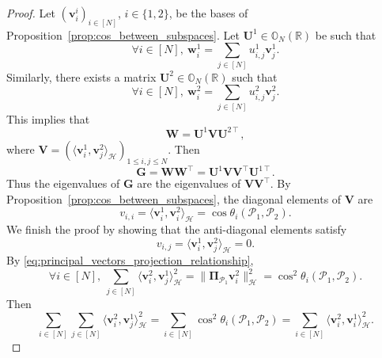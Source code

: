 \documentclass[twoside,11pt]{book}
\DeclareMathOperator{\Tran}{\intercal}
\begin{document}
\begin{proof}
Let $(\bm{v}^{i}_{i})_{i \in [N]}$, $i\in\{1,2\}$, be the bases of Proposition~\ref{prop:cos_between_subspaces}. Let $\bm{U}^{1} \in \mathbb{O}_{N}(\mathbb{R})$ be such that
\begin{equation}
\forall i \in [N], \: \bm{w}^{1}_{i} = \sum\limits_{j \in [N]} u^{1}_{i,j} \bm{v}^{1}_{j}.
\end{equation}
Similarly, there exists a matrix $\bm{U}^{2} \in \mathbb{O}_{N}(\mathbb{R})$ such that
\begin{equation}
\forall i \in [N], \: \bm{w}^{2}_{i} = \sum\limits_{j \in [N]} u^{2}_{i,j} \bm{v}^{2}_{j}.
\end{equation}
This implies that
\begin{equation}
\bm{W} = \bm{U}^{1}\bm{V}\bm{U}^{2 \Tran},
\end{equation}
where $\displaystyle \bm{V} = (\langle \bm{v}^{1}_{i}, \bm{v}^{2}_{j} \rangle_{\mathcal{H}})_{1 \leq i,j \leq N}$. Then
\begin{equation}
\bm{G} = \bm{W}\bm{W}^{\Tran} = \bm{U}^{1}\bm{V}\bm{V}^{\Tran}\bm{U}^{1 \Tran}.
\end{equation}
Thus the eigenvalues of $\bm{G}$ are the eigenvalues of $\bm{V}\bm{V}^{\Tran}$. By Proposition~\ref{prop:cos_between_subspaces}, the diagonal elements of $\bm{V}$ are
\begin{equation}\label{eq:diagonal_of_V}
v_{i,i} = \langle \bm{v}^{1}_{i}, \bm{v}^{2}_{i} \rangle_{\mathcal{H}} = \cos \theta_{i}(\mathcal{P}_{1},\mathcal{P}_{2}).
\end{equation}
We finish the proof by showing that the anti-diagonal elements satisfy
\begin{equation}\label{eq:anti_diagonal_of_V}
v_{i,j} = \langle \bm{v}^{1}_{i}, \bm{v}^{2}_{j} \rangle_{\mathcal{H}} = 0.
\end{equation}
By \eqref{eq:principal_vectors_projection_relationship},
\begin{equation}
\forall i \in [N], \:\sum\limits_{j \in [N]} \langle \bm{v}_{i}^{2}, \bm{v}_{j}^{1}\rangle_{\mathcal{H}}^{2} = \|\bm{\Pi}_{\mathcal{P}_{1}}\bm{v}_{i}^{2}\|_{\mathcal{H}}^{2} = \cos^{2} \theta_{i}(\mathcal{P}_{1},\mathcal{P}_{2}).
\end{equation}
Then
\begin{equation}
 \sum\limits_{i \in [N]}\sum\limits_{j \in [N]} \langle \bm{v}_{i}^{2}, \bm{v}_{j}^{1}\rangle_{\mathcal{H}}^{2} = \sum\limits_{i \in [N]} \cos^{2} \theta_{i}(\mathcal{P}_{1},\mathcal{P}_{2}) = \sum\limits_{i \in [N]} \langle \bm{v}_{i}^{2}, \bm{v}_{i}^{1}\rangle_{\mathcal{H}}^{2} .

\end{equation}
\end{proof}
\end{document}
